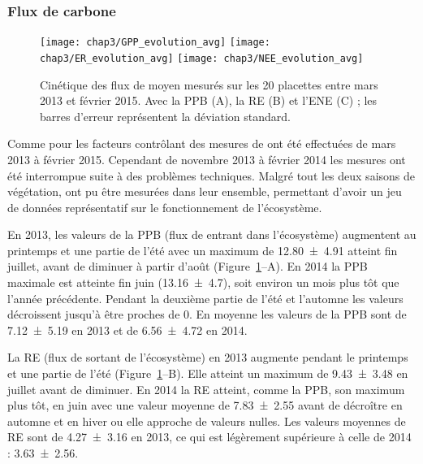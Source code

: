 
\subsubsection{Flux de carbone}

\begin{figure}
	\centering
	\texttt{[image: chap3/GPP\_evolution\_avg]}
	\texttt{[image: chap3/ER\_evolution\_avg]}
	\texttt{[image: chap3/NEE\_evolution\_avg]}
\caption{Cinétique des flux de \coo moyen mesurés sur les 20 placettes entre mars 2013 et février 2015. Avec la PPB (A), la RE (B) et l'ENE (C) ; les barres d'erreur représentent la déviation standard.}
\label{fig:flux_evolution_avg}
\end{figure}

Comme pour les facteurs contrôlant des mesures de \coo ont été effectuées de mars 2013 à février 2015.
Cependant de novembre 2013 à février 2014 les mesures ont été interrompue suite à des problèmes techniques.
Malgré tout les deux saisons de végétation, ont pu être mesurées dans leur ensemble, permettant d'avoir un jeu de données représentatif sur le fonctionnement de l'écosystème.

En 2013, les valeurs de la PPB (flux de \coo entrant dans l'écosystème) augmentent au printemps et une partie de l'été avec un maximum de \SI{12.80(491)}{\uml} atteint fin juillet, avant de diminuer à partir d'août (Figure~\ref{fig:flux_evolution_avg}--A).
En 2014 la PPB maximale est atteinte fin juin (\SI{13.16(470)}{\uml}), soit environ un mois plus tôt que l'année précédente.
Pendant la deuxième partie de l'été et l'automne les valeurs décroissent jusqu'à être proches de 0.
En moyenne les valeurs de la PPB sont de \SI{7.12(519)}{\uml} en 2013 et de \SI{6.56(472)}{\uml} en 2014.

La RE (flux de \coo sortant de l'écosystème) en 2013 augmente pendant le printemps et une partie de l'été (Figure~\ref{fig:flux_evolution_avg}--B).
Elle atteint un maximum de \SI{9.43(348)}{\uml} en juillet avant de diminuer.
En 2014 la RE atteint, comme la PPB, son maximum plus tôt, en juin avec une valeur moyenne de \SI{7.83(255)}{\uml} avant de décroître en automne et en hiver ou elle approche de valeurs nulles.
Les valeurs moyennes de RE sont de \SI{4.27(316)}{\uml} en 2013, ce qui est légèrement supérieure à celle de 2014 : \SI{3.63(256)}{\uml}.

